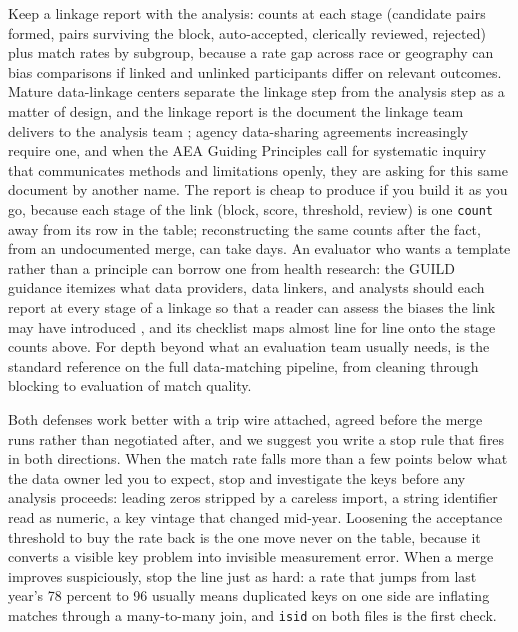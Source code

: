 \documentclass[
    a4paper,
    fontsize=10pt,
    twoside=true,
    numbers=noenddot,
]{kaobook}
\begin{document}
Keep a linkage report with the analysis: counts at each stage (candidate pairs formed, pairs surviving the block, auto-accepted, clerically reviewed, rejected) plus match rates by subgroup, because a rate gap across race or geography can bias comparisons if linked and unlinked participants differ on relevant outcomes. Mature data-linkage centers separate the linkage step from the analysis step as a matter of design, and the linkage report is the document the linkage team delivers to the analysis team \parencite{harron2017challenges}; agency data-sharing agreements increasingly require one, and when the AEA Guiding Principles call for systematic inquiry that communicates methods and limitations openly, they are asking for this same document by another name. The report is cheap to produce if you build it as you go, because each stage of the link (block, score, threshold, review) is one \texttt{count} away from its row in the table; reconstructing the same counts after the fact, from an undocumented merge, can take days. An evaluator who wants a template rather than a principle can borrow one from health research: the GUILD guidance itemizes what data providers, data linkers, and analysts should each report at every stage of a linkage so that a reader can assess the biases the link may have introduced \parencite{gilbert2018guild}, and its checklist maps almost line for line onto the stage counts above. For depth beyond what an evaluation team usually needs, \textcite{christen2012matching} is the standard reference on the full data-matching pipeline, from cleaning through blocking to evaluation of match quality.

Both defenses work better with a trip wire attached, agreed before the merge runs rather than negotiated after, and we suggest you write a stop rule that fires in both directions. When the match rate falls more than a few points below what the data owner led you to expect, stop and investigate the keys before any analysis proceeds: leading zeros stripped by a careless import, a string identifier read as numeric, a key vintage that changed mid-year. Loosening the acceptance threshold to buy the rate back is the one move never on the table, because it converts a visible key problem into invisible measurement error. When a merge improves suspiciously, stop the line just as hard: a rate that jumps from last year's 78 percent to 96 usually means duplicated keys on one side are inflating matches through a many-to-many join, and \texttt{isid} on both files is the first check.
\end{document}
